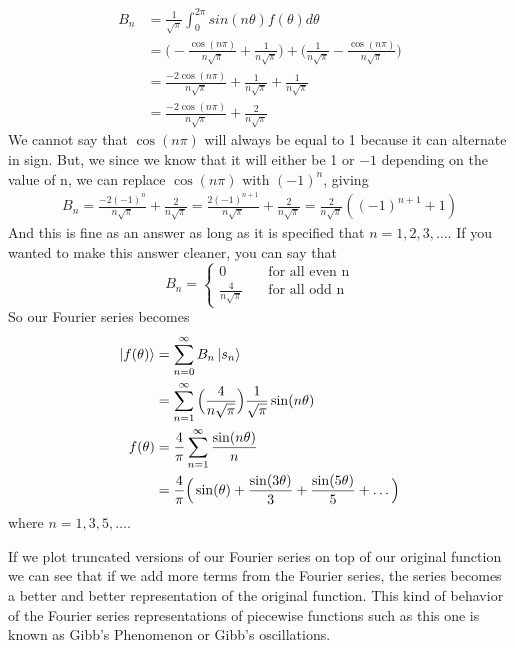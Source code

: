 \documentclass{article}
\newcommand{\be}{\begin{equation}}
\newcommand{\ee}{\end{equation}}
\begin{document}
\be
  \begin{split}
    B_n &= \frac{1}{\sqrt{\pi}} \int_0^{2 \pi} sin(n \theta) f(\theta) d\theta \\
    &= \Big( - \frac{\cos(n \pi)}{n \sqrt{\pi}} + \frac{1}{n \sqrt{\pi}} \Big) + \Big( \frac{1}{n \sqrt{\pi}} - \frac{\cos(n \pi)}{n \sqrt{\pi}} \Big) \\
    &= \frac{-2 \cos(n \pi)}{n \sqrt{\pi}} + \frac{1}{n \sqrt{\pi}} + \frac{1}{n \sqrt{\pi}} \\
    &= \frac{-2 \cos(n \pi)}{n \sqrt{\pi}} + \frac{2}{n \sqrt{\pi}}
  \end{split}
\ee
We cannot say that $\cos(n \pi)$ will always be equal to 1 because it can alternate in sign.
But, we since we know that it will either be 1 or $-1$ depending on the value of n, we can replace $\cos(n \pi)$ with $(-1)^n$, giving
\be
  \begin{split}
    B_n = \frac{-2 (-1)^n}{n \sqrt{\pi}} + \frac{2}{n \sqrt{\pi}} = \frac{2 (-1)^{n+1}}{n \sqrt{\pi}} + \frac{2}{n \sqrt{\pi}} = \frac{2}{n \sqrt{\pi}} ((-1)^{n+1} + 1)
  \end{split}
\ee
And this is fine as an answer as long as it is specified that $n = 1, 2, 3, \hdots$.
If you wanted to make this answer cleaner, you can say that
\be
  B_n =
  \left\{
    \begin{array}{ll}
      0 & \quad \text{for all even n} \\
      \frac{4}{n \sqrt{\pi}} & \quad \text{for all odd n}
    \end{array}
  \right.
\ee
So our Fourier series becomes
\be
  \begin{split}
    \ket{f(\theta)} &= \sum_{n=0}^{\infty} B_n \ket{s_n} \\
    &=  \sum_{n=1}^{\infty} \Big( \frac{4}{n \sqrt{\pi}} \Big) \frac{1}{\sqrt{\pi}} \sin(n \theta) \\
    f(\theta) &= \frac{4}{\pi} \sum_{n=1}^{\infty} \frac{\sin(n \theta)}{n} \\
    &= \frac{4}{\pi} \Big( \sin(\theta) + \frac{\sin(3 \theta)}{3} + \frac{\sin(5 \theta)}{5} + \hdots \Big)
  \end{split}
\ee
where $n = 1, 3, 5, \hdots$.

If we plot truncated versions of our Fourier series on top of our original function
we can see that if we add more terms from the Fourier series, the series becomes a better and better representation of the original function.
This kind of behavior of the Fourier series representations of piecewise functions such as this one is known as Gibb's Phenomenon or Gibb's oscillations.
\end{document}
